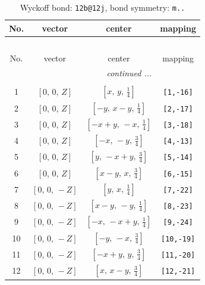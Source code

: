 \documentclass[fleqn,8pt]{jsarticle}
\begin{document}
\renewcommand{\arraystretch}{1.2}
\begin{longtable}{cccc}
\caption{Wyckoff bond: {\tt 12b@12j}, bond symmetry: {\tt m..}}
 \\
 \hline \hline
No. & vector & center & mapping \\ \hline \endfirsthead

\multicolumn{3}{l}{\tablename\ \thetable{}} \\
 \hline \hline
No. & vector & center & mapping \\ \hline \endhead

 \hline \hline
\multicolumn{3}{r}{\footnotesize\it continued ...} \\ \endfoot

 \hline \hline
\multicolumn{3}{r}{} \\ \endlastfoot

1 & $\left[ 0,\, 0,\, Z \right]$ & $\left[ x,\, y,\, \frac{1}{4} \right]$ & {\tt [1,-16]} \\ \hline
2 & $\left[ 0,\, 0,\, Z \right]$ & $\left[ - y,\, x - y,\, \frac{1}{4} \right]$ & {\tt [2,-17]} \\ \hline
3 & $\left[ 0,\, 0,\, Z \right]$ & $\left[ - x + y,\, - x,\, \frac{1}{4} \right]$ & {\tt [3,-18]} \\ \hline
4 & $\left[ 0,\, 0,\, Z \right]$ & $\left[ - x,\, - y,\, \frac{3}{4} \right]$ & {\tt [4,-13]} \\ \hline
5 & $\left[ 0,\, 0,\, Z \right]$ & $\left[ y,\, - x + y,\, \frac{3}{4} \right]$ & {\tt [5,-14]} \\ \hline
6 & $\left[ 0,\, 0,\, Z \right]$ & $\left[ x - y,\, x,\, \frac{3}{4} \right]$ & {\tt [6,-15]} \\ \hline
7 & $\left[ 0,\, 0,\, - Z \right]$ & $\left[ y,\, x,\, \frac{1}{4} \right]$ & {\tt [7,-22]} \\ \hline
8 & $\left[ 0,\, 0,\, - Z \right]$ & $\left[ x - y,\, - y,\, \frac{1}{4} \right]$ & {\tt [8,-23]} \\ \hline
9 & $\left[ 0,\, 0,\, - Z \right]$ & $\left[ - x,\, - x + y,\, \frac{1}{4} \right]$ & {\tt [9,-24]} \\ \hline
10 & $\left[ 0,\, 0,\, - Z \right]$ & $\left[ - y,\, - x,\, \frac{3}{4} \right]$ & {\tt [10,-19]} \\ \hline
11 & $\left[ 0,\, 0,\, - Z \right]$ & $\left[ - x + y,\, y,\, \frac{3}{4} \right]$ & {\tt [11,-20]} \\ \hline
12 & $\left[ 0,\, 0,\, - Z \right]$ & $\left[ x,\, x - y,\, \frac{3}{4} \right]$ & {\tt [12,-21]} \\
\end{longtable}
\end{document}
